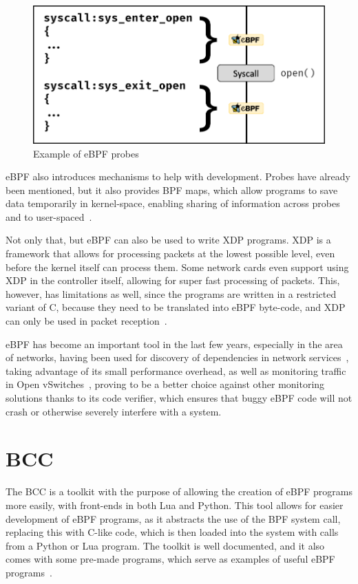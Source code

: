 \begin{figure}[htb]
   \centering
   \includegraphics[scale=.35]{syscall}
   \caption{Example of eBPF probes}\label{fig:syscall}
\end{figure}

eBPF also introduces mechanisms to help with development. Probes have already
been mentioned, but it also provides BPF maps, which allow programs to save data
temporarily in kernel-space, enabling sharing of information across probes and
to user-spaced~\cite{lwm}.

Not only that, but eBPF can also be used to write \ac{XDP} programs. \ac{XDP} is
a framework that allows for processing packets at the lowest possible level,
even before the kernel itself can process them. Some network cards even support
using \ac{XDP} in the controller itself, allowing for super fast processing of
packets. This, however, has limitations as well, since the programs are written
in a restricted variant of C, because they need to be translated into eBPF
byte-code, and \ac{XDP} can only be used in packet reception~\cite{xdp}.

eBPF has become an important tool in the last few years, especially in the area
of networks, having been used for discovery of dependencies in network
services~\cite{ebpfeg1}, taking advantage of its small performance overhead, as
well as monitoring traffic in Open vSwitches~\cite{ebpfeg2}, proving to be a
better choice against other monitoring solutions thanks to its code verifier,
which ensures that buggy eBPF code will not crash or otherwise severely
interfere with a system.


\section{BCC}

The \ac{BCC} is a toolkit with the purpose of allowing the creation of eBPF
programs more easily, with front-ends in both Lua and Python. This tool allows
for easier development of eBPF programs, as it abstracts the use of the \ac{BPF}
system call, replacing this with C-like code, which is then loaded into the
system with calls from a Python or Lua program. The toolkit is well documented,
and it also comes with some pre-made programs, which serve as examples of useful
eBPF programs~\cite{gregg,bcc}.

